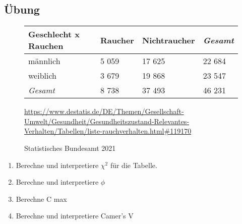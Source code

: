 \subsection{Übung}
\begin{figure}[h!]\centering
\begin{tabular}{p{2cm}|p{2cm}|p{2cm}|p{2cm}}
   Geschlecht x Rauchen & Raucher            & Nichtraucher           & \textit{Gesamt}
\\\hline
   männlich             & 5 059              & 17 625                 & 22 684
\\\hline
   weiblich             & 3 679              & 19 868                 & 23 547
\\\hline
   \textit{Gesamt}      & 8 738              & 37 493                 & 46 231
\end{tabular}
\caption{Statistisches Bundesamt 2021}
\small{\url{https://www.destatis.de/DE/Themen/Gesellschaft-Umwelt/Gesundheit/Gesundheitszustand-Relevantes-Verhalten/Tabellen/liste-rauchverhalten.html#119170}}
\label{7_raucher}
\end{figure}

\begin{enumerate}
  \item Berechne und interpretiere $\chi^2$ für die Tabelle. 
  \item Berechne und interpretiere $\phi$ 
  \item Berechne C max 
  \item Berechne und interpretiere Camer's V 
\end{enumerate}
